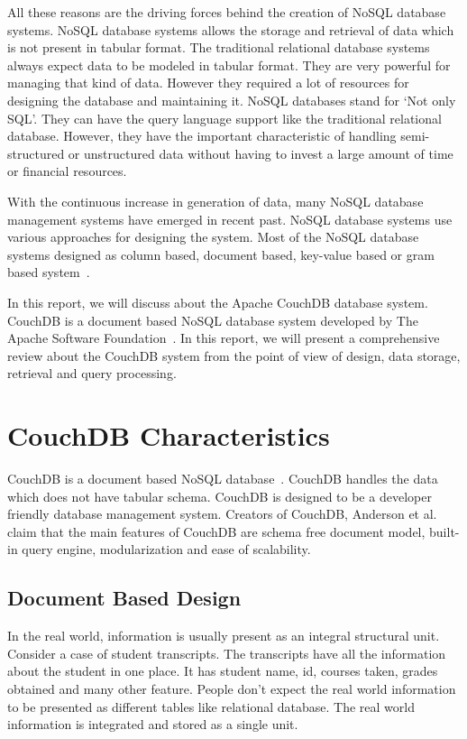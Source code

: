 \documentclass{sig-alternate}
\begin{document}
All these reasons are the driving forces behind the creation of NoSQL database systems. NoSQL database systems allows the storage and retrieval of data which is not present in tabular format. The traditional relational database systems always expect data to be modeled in tabular format. They are very powerful for managing that kind of data. However they required a lot of resources for designing the database and maintaining it. NoSQL databases stand for `Not only SQL'. They can have the query language support like the traditional relational database. However, they have the important characteristic of handling semi-structured or unstructured data without having to invest a large amount of time or financial resources.

With the continuous increase in generation of data, many NoSQL database management systems have emerged in recent past. NoSQL database systems use various approaches for designing the system. Most of the NoSQL database systems designed as column based, document based, key-value based or gram based system~\cite{wikiTypes}.

In this report, we will discuss about the Apache CouchDB database system. CouchDB is a document based NoSQL database system developed by The Apache Software Foundation~\cite{couchDB}. In this report, we will present a comprehensive review about the CouchDB system from the point of view of design, data storage, retrieval and query processing.

\section{CouchDB Characteristics}
\label{couchdb characteristics}
CouchDB is a document based NoSQL database~\cite{Anderson:CouchDB}. CouchDB handles the data which does not have tabular schema. CouchDB is designed to be a developer friendly database management system. Creators of CouchDB, Anderson et al.~\cite{Anderson:CouchDB} claim that the main features of CouchDB are schema free document model, built-in query engine, modularization and ease of scalability.

\subsection{Document Based Design}
\label{document based design}
In the real world, information is usually present as an integral structural unit. Consider a case of student transcripts. The transcripts have all the information about the student in one place. It has student name, id, courses taken, grades obtained and many other feature. People don't expect the real world information to be presented as different tables like relational database. The real world information is integrated and stored as a single unit.
\end{document}
